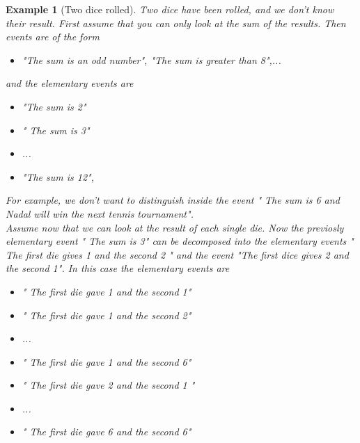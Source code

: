 \documentclass[reqno]{amsart}
\newtheorem{example}[theorem]{Example}
\newcommand{\<}{{\langle \!\! \langle}}
\renewcommand{\>}{{\rangle \!\! \rangle}}
\begin{document}
\begin{example}[Two dice rolled]
Two dice have been rolled, and we don't know their result. First assume that you can only look at the sum of the results.  Then events are of the form 
\begin{itemize}

	\item "The sum is an odd number", "The sum is greater than 8",...

\end{itemize}
and the elementary events are 

\begin{itemize}

	\item "The sum is 2" \\
	\item " The sum is 3"\\ 
	\item ...\\

	\item "The sum is 12",

\end{itemize}
 For example, we don't want to distinguish inside the event " The sum is 6 and Nadal will win the next tennis tournament". \\
 
Assume now that we can look at the result of each single die. Now the previosly elementary event " The sum is 3" can be decomposed into the elementary events " The first die gives 1 and the second 2 " and the event "The first dice gives 2 and the second 1". 
In this case the elementary events are
\begin{itemize}

	\item " The first die gave 1 and the second 1"\\
	\item " The first die gave 1 and the second 2"\\
	\item ...
	\item  " The first die gave 1 and the second 6" \\
	\item " The first die gave 2 and the second 1 "\\

	\item ...
	\item " The first die gave 6 and the second 6"   
\end{itemize}

\end{example} 
\end{document}
